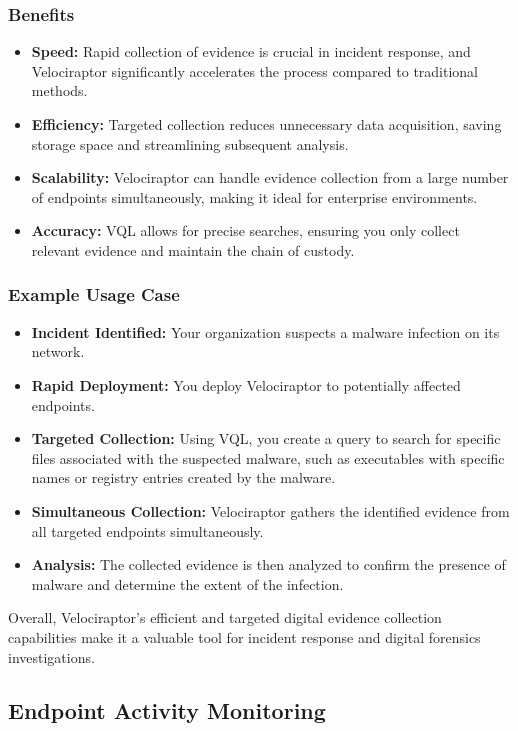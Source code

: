 \documentclass[a4paper, 11pt, oneside]{article} %
\begin{document}
\subsubsection{Benefits}
\begin{itemize}
    \item \textbf{Speed: } Rapid collection of evidence is crucial in incident response, and Velociraptor significantly accelerates the process compared to traditional methods. 
    \item \textbf{Efficiency: } Targeted collection reduces unnecessary data acquisition, saving storage space and streamlining subsequent analysis.
    \item \textbf{Scalability: }Velociraptor can handle evidence collection from a large number of endpoints simultaneously, making it ideal for enterprise environments.
    \item \textbf{Accuracy: }
    VQL allows for precise searches, ensuring you only collect relevant evidence and maintain the chain of custody.
\end{itemize}

\subsubsection{Example Usage Case}
\begin{itemize}
    \item \textbf{Incident Identified: }Your organization suspects a malware infection on its network. 
    \item \textbf{Rapid Deployment: }You deploy Velociraptor to potentially affected endpoints.
    \item \textbf{Targeted Collection: }Using VQL, you create a query to search for specific files associated with the suspected malware, such as executables with specific names or registry entries created by the malware.
    \item \textbf{Simultaneous Collection: } Velociraptor gathers the identified evidence from all targeted endpoints simultaneously.
    \item \textbf{Analysis: }The collected evidence is then analyzed to confirm the presence of malware and determine the extent of the infection.
\end{itemize}
Overall, Velociraptor's efficient and targeted digital evidence collection capabilities make it a valuable tool for incident response and digital forensics investigations.

\subsection{Endpoint Activity Monitoring}
\end{document}
